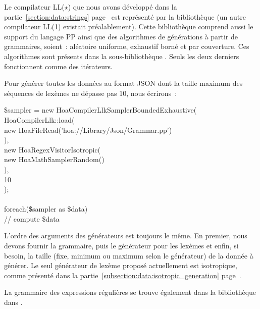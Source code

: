 Le compilateur LL($\star$) que nous avons développé dans la
partie~\ref{section:data:strings} page~\pageref{section:data:strings} est
représenté par la bibliothèque  (un autre
compilateur LL(1) existait préalablement). Cette bibliothèque comprend aussi le
support du langage PP ainsi que des algorithmes de générations à partir de
grammaires, soient~: aléatoire uniforme, exhaustif borné et par couverture. Ces
algorithmes sont présents dans la sous-bibliothèque
.  Seuls les deux
derniers fonctionnent comme des itérateurs.

\begin{example}

Pour générer toutes les données au format JSON dont la taille maximum des
séquences de lexèmes ne dépasse pas 10, nous écrirons~:
%
\begin{pre}
\$sampler = new Hoa\bslash{}Compiler\bslash{}Llk\bslash{}Sampler\bslash{}BoundedExhaustive( \\
    Hoa\bslash{}Compiler\bslash{}Llk::load( \\
        new Hoa\bslash{}File\bslash{}Read('hoa://Library/Json/Grammar.pp') \\
    ), \\
    new Hoa\bslash{}Regex\bslash{}Visitor\bslash{}Isotropic( \\
        new Hoa\bslash{}Math\bslash{}Sampler\bslash{}Random() \\
    ), \\
    10 \\
); \\
 \\
foreach(\$sampler as \$data) \\
    // compute \$data
\end{pre}

L'ordre des arguments des générateurs est toujours le même. En premier, nous
devons fournir la grammaire, puis le générateur pour les lexèmes et enfin, si
besoin, la taille (fixe, minimum ou maximum selon le générateur) de la donnée à
générer. Le seul générateur de lexème proposé actuellement est isotropique,
comme présenté dans la partie~\ref{subsection:data:isotropic_generation}
page~\pageref{subsection:data:isotropic_generation}.

\end{example}

La grammaire des expressions régulières se trouve également dans la bibliothèque
 dans .

